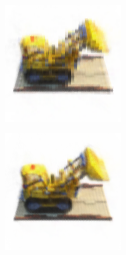 \documentclass{article}
\begin{document}
\begin{figure}[!h]
\begin{subfigure}{.19\textwidth}
\end{subfigure}
\begin{subfigure}{.19\textwidth}
  \centering
  \includegraphics[width=\linewidth]{figs/model3.png}  
\end{subfigure}
\begin{subfigure}{.19\textwidth}
  \centering
  \includegraphics[width=\linewidth]{figs/model15.png}  

\end{subfigure}
\end{figure}
\end{document}
